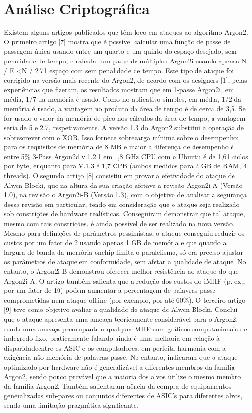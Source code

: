 \documentclass[conference]{IEEEtran}
\begin{document}
\section{Análise Criptográfica}

Existem alguns artigos publicados que têm foco em ataques ao algoritmo Argon2. 
O primeiro artigo [7]\cite{rfc9106} mostra que é possível calcular uma função de passe de passagem única usando entre um quarto e 
um quinto do espaço desejado, sem penalidade de tempo, e calcular um passe de múltiplos Argon2i usando 
apenas N / E <N / 2.71 espaço com sem penalidade de tempo. Este tipo de ataque foi corrigido na versão mais recente do Argon2, 
de acordo com os designers [1]\cite{rfc9106}, pelas experiências que fizeram, os resultados mostram que em 1-passe Argon2i, em média, 
1/7 da memória é usado. Como no aplicativo simples, em média, 1/2 da memória é usado, 
a vantagem no produto da área de tempo é de cerca de 3,5. Se for usado o valor da memória de pico nos cálculos da área de tempo, 
a vantagem seria de 5 e 2.7, respetivamente. A versão 1.3 do Argon2 substitui a operação de sobrescrever com o XOR. 
Isso fornece sobrecarga mínima sobre o desempenho: para os requisitos de memória de 8 MB e maior a 
diferença de desempenho é entre 5\% 3-Pass Argon2d v.1.2.1 em 1,8 GHz CPU com o Ubuntu é de 1,61 ciclos por byte, 
enquanto para V.1.3 é 1,7 CPB (ambos medidos para 2 GB de RAM, 4 threads).
O segundo artigo [8]\cite{rfc9106} consistiu em provar a efetividade do ataque de Alwen-Blocki, 
que na altura da sua criação afetava a revisão Argon2i-A (Versão 1.0), na revisão o Argon2i-B (Versão 1.3), 
com o objetivo de analisar a segurança dessa revisão em particular, 
tendo em consideração que o ataque seja realizado sob constrições de hardware realísticas. 
Conseguiram demonstrar que tal ataque, mesmo com tais constrições, é ainda possível de ser realizado na nova versão. 
Mesmo para definições de parâmetros pessimistas, o ataque conseguiu reduzir os custos por um fator de 2 usando apenas 
1 GB de memória e que quando a largura de banda da memória onchip limita o paralelismo, 
só era preciso ajustar os parâmetros de ataque em conformidade, sem afetar a qualidade de ataque. No entanto, 
o Argon2i-B demonstrou oferecer melhor resistência ao ataque do que Argon2i-A. 
O artigo também salienta que a redução dos custos do iMHF (p. ex., por um fator de 10) podem aumentar a 
percentagem de palavras-passe comprometidas num ataque offline (por exemplo, por até 60\%). 
O terceiro artigo [9]\cite{rfc9106} teve como objetivo avaliar a qualidade do ataque de Alwen-Blocki. 
Conclui que o ataque apresenta uma ameaça teoricamente considerável para o Argon2, 
sendo uma ameaça preocupante a qualquer MHF com gráficos computacionais de indegredo fixo, 
praticamente falando ainda é uma melhoria em relação à disparidadeentre os ASIC e os computadores, 
em perfeita harmonia com a exigência não-memória de palavras-passe. No entanto, 
indicaram que o ataque optimizado por hardware não é generalizável a diferentes membros da família Argon2, 
sendo pouco provável que a maioria dos alvos utilize o mesmo membro da família Argon2. 
Também salientaram aência da compra de equipamentos generalizados sub-pares ou conjuntos diferentes de ASIC's para diferentes alvos, 
sendo uma limitação pragmática significante.
\end{document}
